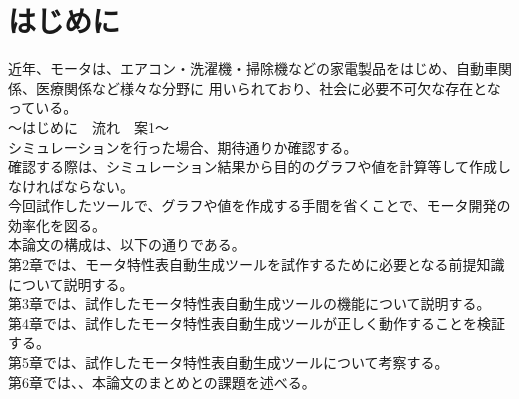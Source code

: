 \chapter{はじめに}\label{cha:Introduction}
近年、モータは、エアコン・洗濯機・掃除機などの家電製品をはじめ、自動車関係、医療関係など様々な分野に
用いられており\cite{モータ使用製品}、社会に必要不可欠な存在となっている。\\

～はじめに　流れ　案1～\\
シミュレーションを行った場合、期待通りか確認する。\\
確認する際は、シミュレーション結果から目的のグラフや値を計算等して作成しなければならない。\\
今回試作したツールで、グラフや値を作成する手間を省くことで、モータ開発の効率化を図る。\\



本論文の構成は、以下の通りである。\\
第2章では、モータ特性表自動生成ツールを試作するために必要となる前提知識について説明する。\\
第3章では、試作したモータ特性表自動生成ツールの機能について説明する。\\
第4章では、試作したモータ特性表自動生成ツールが正しく動作することを検証する。\\
第5章では、試作したモータ特性表自動生成ツールについて考察する。\\
第6章では、、本論文のまとめとの課題を述べる。\\